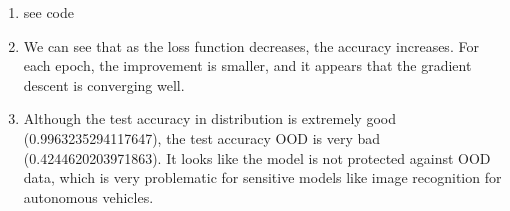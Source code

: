 \documentclass[submit]{harvardml}
\begin{document}
\newpage
\begin{sol}{}
  \begin{center}
    \begin{enumerate}
      \item see code
      \item We can see that as the loss function decreases,
      the accuracy increases. For each epoch, the improvement
      is smaller, and it appears that the gradient descent is
      converging well.
      \item Although the test accuracy in distribution is extremely good (0.9963235294117647), 
      the test accuracy OOD is very bad (0.4244620203971863). It looks like the model
      is not protected against OOD data, which is very problematic for
      sensitive models like image recognition for autonomous vehicles.


    \end{enumerate}
  \end{center}
\end{sol}

\newpage

\end{document}
